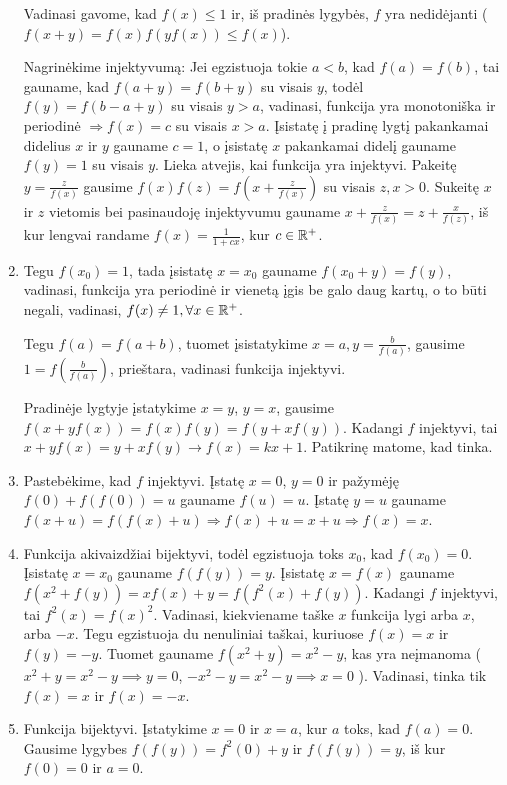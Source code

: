 \begin{enumerate}
    Vadinasi gavome, kad $f(x)\leq 1$ ir, iš pradinės lygybės, $f$ yra
    nedidėjanti ($f(x+y)=f(x)f(yf(x))\leq f(x)$).
    
    Nagrinėkime injektyvumą: Jei egzistuoja tokie $a < b$, kad
    $f(a)=f(b)$, tai gauname, kad $f(a+y)=f(b+y)$ su visais $y$, todėl
    $f(y)=f(b-a+y)$ su visais $y>a$, vadinasi, funkcija yra monotoniška ir
    periodinė $\Rightarrow f(x)= c$ su visais $x >a$. Įsistatę į pradinę
    lygtį pakankamai didelius $x$ ir $y$ gauname $c = 1$, o įsistatę $x$
    pakankamai didelį gauname $f(y)=1$ su visais $y$.
    Lieka atvejis, kai funkcija yra injektyvi. Pakeitę $y=\frac{z}{f(x)}$
    gausime $f(x)f(z)=f(x+\frac{z}{f(x)})$ su visais $z,x >0$. Sukeitę $x$
    ir $z$ vietomis bei pasinaudoję injektyvumu gauname $x +
    \frac{z}{f(x)} = z + \frac{x}{f(z)}$, iš kur lengvai randame
    $f(x)=\frac{1}{1+cx}$, kur $c\in \mathbb R^+$.
\item
    Tegu $f(x_0)=1$, tada įsistatę $x=x_0$ gauname $f(x_0+y)=f(y)$,
    vadinasi, funkcija yra periodinė ir vienetą įgis be galo daug kartų, o
    to būti negali, vadinasi, $f(x)\neq 1, \forall x\in \mathbb R^+$.
    
    Tegu $f(a)=f(a+b)$, tuomet įsistatykime $x=a, y=\frac{b}{f(a)}$,
    gausime $1=f(\frac{b}{f(a)})$, prieštara, vadinasi funkcija injektyvi.
    
    Pradinėje lygtyje įstatykime $x=y$, $y=x$, gausime
    $f(x+yf(x))=f(x)f(y) =f(y+xf(y))$. Kadangi $f$ injektyvi, tai
    $x+yf(x)=y+xf(y) \rightarrow f(x)=kx+1$. Patikrinę matome, kad tinka.
\item
    Pastebėkime, kad $f$ injektyvi.  Įstatę $x=0$, $y=0$ ir pažymėję
    $f(0)+f(f(0))=u$ gauname $f(u)=u$.  Įstatę $y=u$ gauname
    $f(x+u)=f(f(x)+u) \Rightarrow f(x)+u=x+u \Rightarrow f(x)=x$.
\item
    Funkcija akivaizdžiai bijektyvi, todėl egzistuoja toks $x_0$, kad
    $f(x_0)=0$. Įsistatę $x=x_0$ gauname $f(f(y))=y$.  Įsistatę $x=f(x)$
    gauname $f(x^2+f(y))=xf(x)+y=f(f^2(x)+f(y))$. Kadangi $f$ injektyvi,
    tai $f^2(x)=f(x)^2$. Vadinasi, kiekviename taške $x$ funkcija lygi arba
    $x$, arba $-x$. Tegu egzistuoja du nenuliniai taškai, kuriuose $f(x)=x$
    ir $f(y)=-y$. Tuomet gauname $f(x^2+y)=x^2-y$, kas yra neįmanoma
    ($x^2+y = x^2-y\implies y=0$, $-x^2-y = x^2-y\implies x=0$ ).
    Vadinasi, tinka tik $f(x)=x$ ir $f(x)=-x$.
\item
    Funkcija bijektyvi. Įstatykime $x=0$ ir $x=a$, kur $a$ toks, kad
    $f(a)=0$. Gausime lygybes $f(f(y))=f^2(0) + y$ ir $f(f(y))=y$, iš kur
    $f(0) = 0$ ir $a=0$.
    

\end{enumerate}
